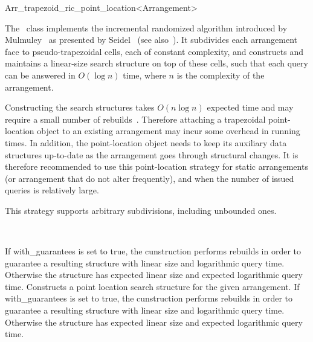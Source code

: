 
\ccRefPageBegin

\begin{ccRefClass}{Arr_trapezoid_ric_point_location<Arrangement>}
\label{arr_ref:trap_pl}

\ccDefinition

The \ccRefName\ class implements the incremental randomized algorithm
introduced by Mulmuley~\cite{m-fppa-90} as presented by
Seidel~\cite{s-sfira-91} (see also~\cite[Chapter~6]{bkos-cgaa-00}).
It subdivides each arrangement face to pseudo-trapezoidal cells, each
of constant complexity, and constructs and maintains a linear-size search
structure on top of these cells, such that each query can be answered
in $O(\log n)$ time, where $n$ is the complexity of the arrangement.

Constructing the search structures takes $O(n \log n)$ expected time 
and may require a small number of rebuilds~\cite{hkh-iiplgtds-12}. Therefore
attaching a trapezoidal point-location object to an existing arrangement
may incur some overhead in running times. In addition, the point-location
object needs to keep its auxiliary data structures up-to-date as the
arrangement goes through structural changes. It is therefore recommended
to use this point-location strategy for static arrangements (or arrangement
that do not alter frequently), and when the number of issued queries
is relatively large.

This strategy supports arbitrary subdivisions, including unbounded ones.


\ccIsModel
   \\

\ccCreation
{}

{If with\_guarantees is set to true, the cunstruction performs rebuilds in order to guarantee a resulting structure with linear size and logarithmic query time. Otherwise the structure has expected linear size and expected logarithmic query time.}
{Constructs a point location search structure for the given arrangement. If with\_guarantees is set to true, the cunstruction performs rebuilds in order to guarantee a resulting structure with linear size and logarithmic query time. Otherwise the structure has expected linear size and expected logarithmic query time.}


\end{ccRefClass}
